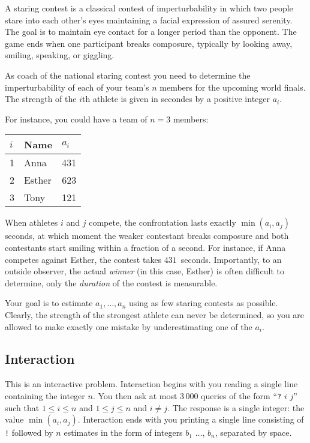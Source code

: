 
A staring contest is a classical contest of imperturbability in which two people stare into each other's eyes maintaining a facial expression of assured serenity.
The goal is to maintain eye contact for a longer period than the opponent.
The game ends when one participant breaks composure, typically by looking away, smiling, speaking, or giggling.

As coach of the national staring contest you need to determine the imperturbability of each of your team's $n$ members for the upcoming world finals.
The strength of the $i$th athlete is given in secondes by a positive integer $a_i$.

For instance, you could have a team of $n=3$ members:

\medskip
\begin{tabular}{lll}
  $i$ & Name & $a_i$\\\hline
  1 & Anna &  431 \\
  2 & Esther & 623 \\
  3 & Tony &  121\\
\end{tabular}

\medskip
When athletes $i$ and $j$ compete, the confrontation lasts exactly $\min(a_i, a_j)$ seconds, at which moment the weaker contestant breaks composure and both contestants start smiling within a fraction of a second.
For instance, if Anna competes against Esther, the contest takes $431$~seconds.
Importantly, to an outside observer, the actual \emph{winner} (in this case, Esther) is often difficult to determine, only the \emph{duration} of the contest is measurable.

Your goal is to estimate $a_1,\ldots, a_n$ using as few staring contests as possible.
Clearly, the strength of the strongest athlete can never be determined, so you are allowed to make exactly one mistake by underestimating one of the $a_i$.

\subsection*{Interaction}

This is an interactive problem.
Interaction begins with you reading a single line containing the integer $n$.
You then ask at most $3\,000$ queries of the form ``\texttt{?} $i$ $j$'' such that $1\leq i\leq n$ and $1\leq j\leq n$ and $i\neq j$.
The response is a single integer: the value $\min(a_i, a_j)$.
Interaction ends with you printing a single line consisting of \texttt{!} followed by $n$ estimates in the form of integers $b_1$ $\ldots$, $b_n$, separated by space.

